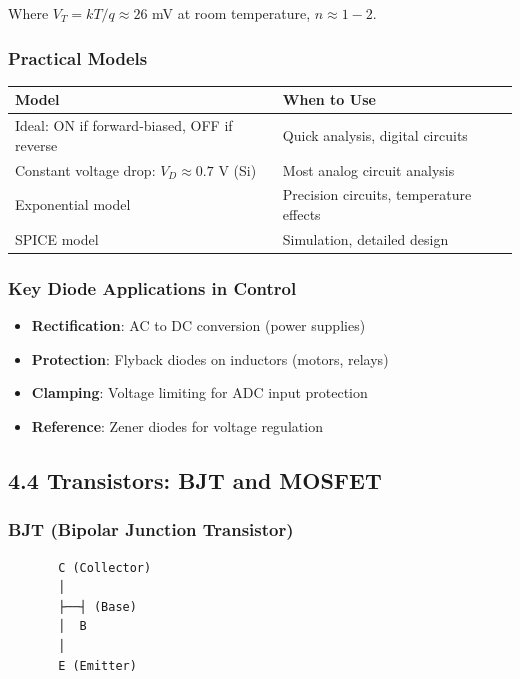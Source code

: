 \documentclass[11pt,a4paper]{book}
\begin{document}
Where $V_T = kT/q \approx 26$ mV at room temperature, $n \approx 1-2$.

\subsubsection{Practical Models}

\begin{center}
\begin{tabular}{|l|l|}
\hline
Model & When to Use \\
\hline
Ideal: ON if forward-biased, OFF if reverse & Quick analysis, digital circuits \\
Constant voltage drop: $V_D \approx 0.7$ V (Si) & Most analog circuit analysis \\
Exponential model & Precision circuits, temperature effects \\
SPICE model & Simulation, detailed design \\
\hline
\end{tabular}
\end{center}

\subsubsection{Key Diode Applications in Control}

\begin{itemize}
\item \textbf{Rectification}: AC to DC conversion (power supplies)
\item \textbf{Protection}: Flyback diodes on inductors (motors, relays)
\item \textbf{Clamping}: Voltage limiting for ADC input protection
\item \textbf{Reference}: Zener diodes for voltage regulation
\end{itemize}

\medskip\noindent\hrulefill\medskip

\subsection{4.4 Transistors: BJT and MOSFET}

\subsubsection{BJT (Bipolar Junction Transistor)}

\begin{lstlisting}
       C (Collector)
       │
       ├──┤ (Base)
       │  B
       │
       E (Emitter)
\end{lstlisting}
\end{document}
